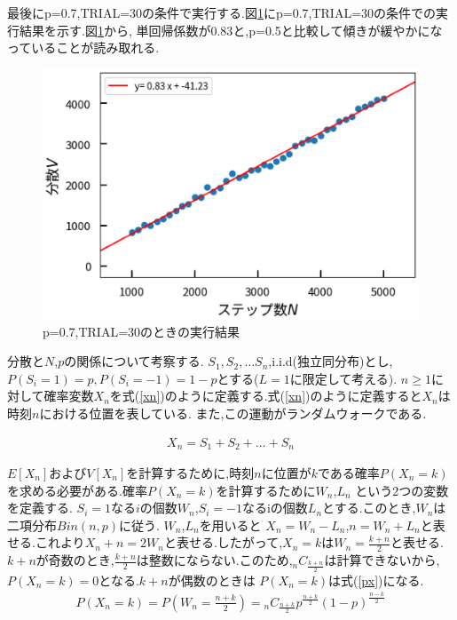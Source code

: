 \documentclass[a4j]{jarticle}
\begin{document}
        最後にp=0.7,TRIAL=30の条件で実行する.図\ref{p07}にp=0.7,TRIAL=30の条件での実行結果を示す.図\ref{p07}から,
        単回帰係数が$0.83$と,p=0.5と比較して傾きが緩やかになっていることが読み取れる.

        \begin{figure}[H]
            \centering
            \includegraphics[scale=0.6]{p07.eps}
            \caption{p=0.7,TRIAL=30のときの実行結果}
            \label{p07}
            \end{figure}   

        分散と$N$,$p$の関係について考察する. $S_1,S_2,\dots S_n$,i.i.d(独立同分布)とし,$P(S_i=1)=p,P(S_i=-1)=1-p$とする($L=1$に限定して考える).
        $n \geq 1$に対して確率変数$X_n$を式(\ref{xn})のように定義する.式(\ref{xn})のように定義すると$X_n$は時刻$n$における位置を表している.
        また,この運動がランダムウォークである.

        \begin{eqnarray}
          X_n = S_1 + S_2 + \dots + S_n \label{xn}
        \end{eqnarray}

        $E[X_n]$および$V[X_n]$を計算するために,時刻$n$に位置が$k$である確率$P(X_n = k)$を求める必要がある.確率$P(X_n = k)$を計算するために$W_n$,$L_n$
        という2つの変数を定義する. $S_i=1$なる$i$の個数$W_n$,$S_i=-1$なるiの個数$L_n$とする.このとき,$W_n$は二項分布$Bin(n,p)$に従う. $W_n$,$L_n$を用いると
        $X_n=W_n-L_n$,$n=W_n+L_n$と表せる.これより$X_n+n=2W_n$と表せる.したがって,$X_n=k$は$W_n=\frac{k+n}{2}$と表せる.
        $k+n$が奇数のとき,$\frac{k+n}{2}$は整数にならない.このため,$_n C _\frac{k+n}{2}$は計算できないから,$P(X_n =k)=0$となる.$k+n$が偶数のときは
        $P(X_n=k)$は式(\ref{px})になる.
        \begin{eqnarray}
            P(X_n=k) = P\left( W_n = \frac{n+k}{2} \right) = {}_n C _{\frac{n+k}{2}} p^{\frac{n+k}{2}} (1-p)^{\frac{n-k}{2}} \label{px}
          \end{eqnarray}
\end{document}
